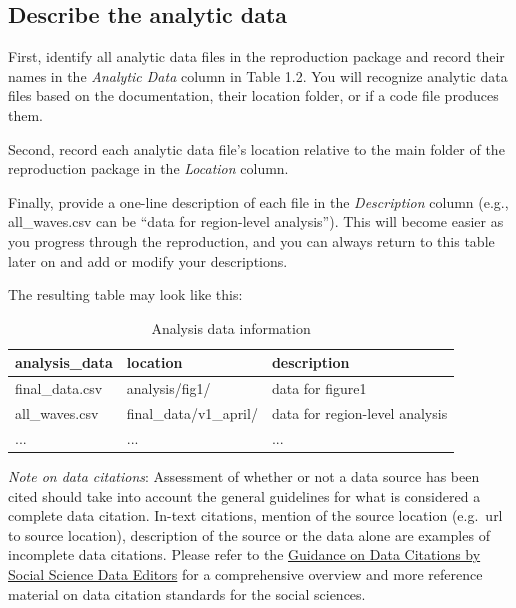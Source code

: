 \documentclass[
]{book}
\begin{document}
\hypertarget{desc-analy}{%
\subsection{Describe the analytic data}\label{desc-analy}}

First, identify all analytic data files in the reproduction package and record their names in the \emph{Analytic Data} column in Table 1.2. You will recognize analytic data files based on the documentation, their location folder, or if a code file produces them.

Second, record each analytic data file's location relative to the main folder of the reproduction package in the \emph{Location} column.

Finally, provide a one-line description of each file in the \emph{Description} column (e.g., all\_waves.csv can be ``data for region-level analysis''). This will become easier as you progress through the reproduction, and you can always return to this table later on and add or modify your descriptions.

The resulting table may look like this:

\begin{table}

\caption{\label{tab:analysis-data-information}Analysis data information}
\centering
\begin{tabu} to 
\hline
analysis\_data & location & description\\
\hline
final\_data.csv & analysis/fig1/ & data for figure1\\
\hline
all\_waves.csv & final\_data/v1\_april/ & data for region-level analysis\\
\hline
... & ... & ...\\
\hline
\end{tabu}
\end{table}

\emph{Note on data citations}: Assessment of whether or not a data source has been cited should take into account the general guidelines for what is considered a complete data citation. In-text citations, mention of the source location (e.g.~url to source location), description of the source or the data alone are examples of incomplete data citations. Please refer to the \href{https://social-science-data-editors.github.io/guidance/addtl-data-citation-guidance.html\#generic-guidance}{Guidance on Data Citations by Social Science Data Editors} for a comprehensive overview and more reference material on data citation standards for the social sciences.
\end{document}
